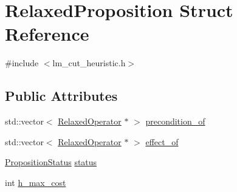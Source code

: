 \hypertarget{structRelaxedProposition}{\section{Relaxed\-Proposition Struct Reference}
\label{structRelaxedProposition}
}


{\ttfamily \#include $<$lm\-\_\-cut\-\_\-heuristic.\-h$>$}

\subsection*{Public Attributes}
\begin{DoxyCompactItemize}
\item 
std\-::vector$<$ \hyperlink{structRelaxedOperator}{Relaxed\-Operator} $\ast$ $>$ \hyperlink{structRelaxedProposition_af09b9d4415f4f773df07e9cdddbf231e}{precondition\-\_\-of}
\item 
std\-::vector$<$ \hyperlink{structRelaxedOperator}{Relaxed\-Operator} $\ast$ $>$ \hyperlink{structRelaxedProposition_a5679f5937f62ed7f3e4158c1163e508f}{effect\-\_\-of}
\item 
\hyperlink{lm__cut__heuristic_8h_aa1953264ebd683f83f8877c68e6dff8a}{Proposition\-Status} \hyperlink{structRelaxedProposition_ae220b85dd3767656e8882afa9209fcbc}{status}
\item 
int \hyperlink{structRelaxedProposition_a67c1a074af9bdadc4d3e7ac27e73a827}{h\-\_\-max\-\_\-cost}
\end{DoxyCompactItemize}



